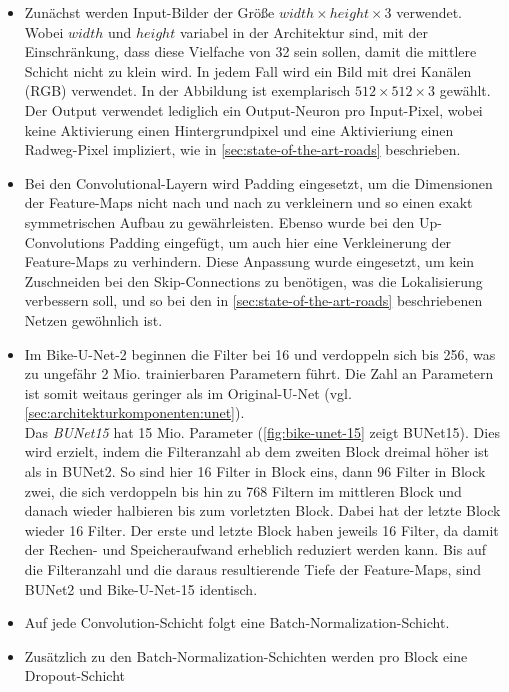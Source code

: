 \begin{itemize}
	\item Zunächst werden Input-Bilder der Größe $width \times height \times 3$ verwendet. 
	Wobei $width$ und $height$ variabel in der Architektur sind, mit der Einschränkung, 
	dass diese Vielfache von 32 sein sollen, damit die mittlere Schicht nicht zu klein wird. 
	In jedem Fall wird ein Bild mit drei Kanälen (RGB) verwendet. 
	In der Abbildung ist exemplarisch $512 \times 512 \times 3$ gewählt. \\
	Der Output verwendet lediglich ein Output-Neuron pro Input-Pixel, wobei keine Aktivierung einen Hintergrundpixel 
	und eine Aktivieriung einen Radweg-Pixel impliziert, wie in \autoref{sec:state-of-the-art-roads} beschrieben. 
	\item Bei den Convolutional-Layern wird Padding eingesetzt,
	um die Dimensionen der Feature-Maps nicht nach und nach zu verkleinern und so einen exakt symmetrischen Aufbau zu gewährleisten.
	Ebenso wurde bei den Up-Convolutions Padding eingefügt, um auch hier eine Verkleinerung der Feature-Maps zu verhindern.
	Diese Anpassung wurde eingesetzt, um kein Zuschneiden bei den Skip-Connections zu benötigen, was die Lokalisierung verbessern soll,
	und so bei den in \autoref{sec:state-of-the-art-roads} beschriebenen Netzen gewöhnlich ist.
	\item 
	Im Bike-U-Net-2 beginnen die Filter bei 16 und verdoppeln sich bis 256, was zu ungefähr 2 Mio. 
	trainierbaren Parametern führt. Die Zahl an Parametern ist somit weitaus geringer als im 
	Original-U-Net (vgl. \autoref{sec:architekturkomponenten:unet}). \\
    Das \textit{\acf{BUNet15}} hat 15 Mio. Parameter (\autoref{fig:bike-unet-15} zeigt \ac{BUNet15}). Dies wird erzielt, 
	indem die Filteranzahl ab dem zweiten Block dreimal höher ist als in \ac{BUNet2}. So sind hier 16 Filter in Block eins, 
	dann 96 Filter in Block zwei, die sich verdoppeln bis hin zu 768 Filtern im mittleren Block und danach wieder halbieren bis zum vorletzten Block. 
	Dabei hat der letzte Block wieder 16 Filter. 
	Der erste und letzte Block haben jeweils 16 Filter, da damit der Rechen- und Speicheraufwand erheblich reduziert werden kann.
	Bis auf die Filteranzahl und die daraus resultierende Tiefe der Feature-Maps, sind \ac{BUNet2} und Bike-U-Net-15 identisch.
	\item Auf jede Convolution-Schicht folgt eine Batch-Normalization-Schicht. 
	\item Zusätzlich zu den Batch-Normalization-Schichten werden pro Block eine Dropout-Schicht 

\end{itemize}
